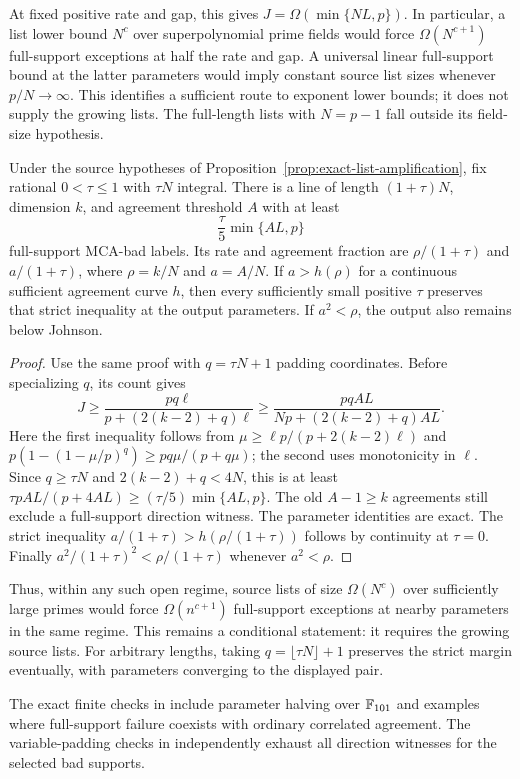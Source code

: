 At fixed positive rate and gap, this gives
$J=\Omega(\min\{NL,p\})$. In particular, a list lower bound $N^c$
over superpolynomial prime fields would force $\Omega(N^{c+1})$
full-support exceptions at half the rate and gap. A universal linear
full-support bound at the latter parameters would imply constant
source list sizes whenever $p/N\to\infty$. This identifies a sufficient
route to exponent lower bounds; it does not supply the growing lists.
The full-length lists with $N=p-1$ fall outside its field-size hypothesis.

\begin{corollary}
\label{cor:sparse-list-amplification}
Under the source hypotheses of Proposition~\ref{prop:exact-list-amplification},
fix rational $0<\tau\le1$ with $\tau N$ integral. There is a line of
length $(1+\tau)N$, dimension $k$, and agreement threshold $A$ with
at least
\[
 \frac{\tau}{5}\min\{AL,p\}
\]
full-support MCA-bad labels. Its rate and agreement fraction are
$\rho/(1+\tau)$ and $a/(1+\tau)$, where $\rho=k/N$ and $a=A/N$.
If $a>h(\rho)$ for a continuous sufficient agreement curve $h$, then
every sufficiently small positive $\tau$ preserves that strict inequality
at the output parameters. If $a^2<\rho$, the output also remains below
Johnson.
\end{corollary}
\begin{proof}
Use the same proof with $q=\tau N+1$ padding coordinates. Before
specializing $q$, its count gives
\[
 J\ge\frac{pq\ell}{p+(2(k-2)+q)\ell}
   \ge\frac{pqAL}{Np+(2(k-2)+q)AL}.
\]
Here the first inequality follows from
$\mu\ge\ell p/(p+2(k-2)\ell)$ and
$p(1-(1-\mu/p)^q)\ge pq\mu/(p+q\mu)$; the second uses monotonicity
in $\ell$. Since $q\ge\tau N$ and $2(k-2)+q<4N$, this is at least
$\tau pAL/(p+4AL)\ge(\tau/5)\min\{AL,p\}$.
The old $A-1\ge k$ agreements still exclude a full-support direction
witness. The parameter identities are exact. The strict inequality
$a/(1+\tau)>h(\rho/(1+\tau))$ follows by continuity at $\tau=0$.
Finally $a^2/(1+\tau)^2<\rho/(1+\tau)$ whenever $a^2<\rho$.
\end{proof}

Thus, within any such open regime, source lists of size $\Omega(N^c)$
over sufficiently large primes would force $\Omega(n^{c+1})$ full-support
exceptions at nearby parameters in the same regime. This remains a
conditional statement: it requires the growing source lists. For arbitrary
lengths, taking $q=\lfloor\tau N\rfloor+1$ preserves the strict margin
eventually, with parameters converging to the displayed pair.

The exact finite checks in
include parameter halving over $\mathbb F_{101}$ and examples where full-support
failure coexists with ordinary correlated agreement.
The variable-padding checks in
independently exhaust all direction witnesses for the selected bad supports.
